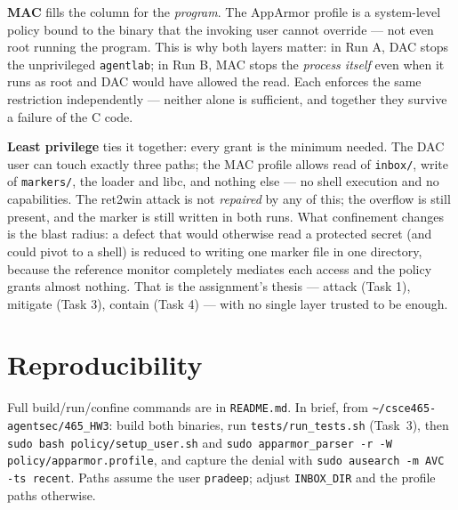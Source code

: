 \documentclass[11pt]{article}
\newcommand{\file}[1]{\texttt{#1}}
\begin{document}
\textbf{MAC} fills the column for the \emph{program}. The AppArmor profile is a
system-level policy bound to the binary that the invoking user cannot override
--- not even root running the program. This is why both layers matter: in Run A,
DAC stops the unprivileged \texttt{agentlab}; in Run B, MAC stops the
\emph{process itself} even when it runs as root and DAC would have allowed the
read. Each enforces the same restriction independently --- neither alone is
sufficient, and together they survive a failure of the C code.

\textbf{Least privilege} ties it together: every grant is the minimum needed.
The DAC user can touch exactly three paths; the MAC profile allows read of
\file{inbox/}, write of \file{markers/}, the loader and libc, and nothing else
--- no shell execution and no capabilities. The ret2win attack is not
\emph{repaired} by any of this; the overflow is still present, and the marker is
still written in both runs. What confinement changes is the blast radius: a
defect that would otherwise read a protected secret (and could pivot to a shell)
is reduced to writing one marker file in one directory, because the reference
monitor completely mediates each access and the policy grants almost nothing.
That is the assignment's thesis --- attack (Task 1), mitigate (Task 3), contain
(Task 4) --- with no single layer trusted to be enough.

\section*{Reproducibility}
Full build/run/confine commands are in \file{README.md}. In brief, from
\file{\textasciitilde/csce465-agentsec/465\_HW3}: build both binaries, run
\file{tests/run\_tests.sh} (Task~3), then \file{sudo bash policy/setup\_user.sh}
and \texttt{sudo apparmor\_parser -r -W policy/apparmor.profile}, and capture
the denial with \texttt{sudo ausearch -m AVC -ts recent}. Paths assume the user
\texttt{pradeep}; adjust \texttt{INBOX\_DIR} and the profile paths otherwise.
\end{document}
